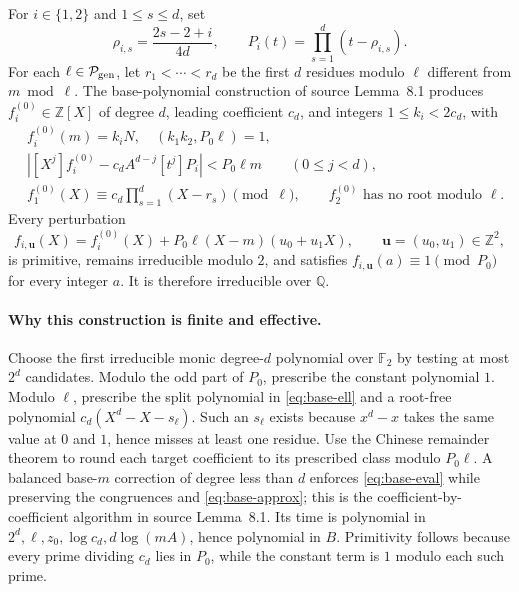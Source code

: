 For \(i\in\{1,2\}\) and \(1\le s\le d\), set
\[
 \rho_{i,s}=\frac{2s-2+i}{4d},\qquad
 P_i(t)=\prod_{s=1}^d(t-\rho_{i,s}).
\]
For each \(\ell\in\mathcal P_{\rm gen}\), let \(r_1<\cdots<r_d\)
be the first \(d\) residues modulo \(\ell\) different from \(m\bmod\ell\).
The base-polynomial construction of source Lemma~8.1 produces
\(f_i^{(0)}\in\mathbb Z[X]\) of degree \(d\), leading coefficient
\(c_d\), and integers \(1\le k_i<2c_d\), with
\begin{align}
 &f_i^{(0)}(m)=k_iN,\quad
       (k_1k_2,P_0\ell)=1,\label{eq:base-eval}\\
 &\left|[X^j]f_i^{(0)}-c_dA^{d-j}[t^j]P_i\right|
       <P_0\ell m\qquad(0\le j<d),\label{eq:base-approx}\\
 &f_1^{(0)}(X)\equiv c_d\prod_{s=1}^d(X-r_s)\pmod\ell,
       \qquad f_2^{(0)}\text{ has no root modulo }\ell.\label{eq:base-ell}
\end{align}
Every perturbation
\begin{equation}\label{eq:perturb}
 f_{i,\mathbf u}(X)
 =f_i^{(0)}(X)+P_0\ell(X-m)(u_0+u_1X),
 \qquad \mathbf u=(u_0,u_1)\in\mathbb Z^2,
\end{equation}
is primitive, remains irreducible modulo \(2\), and satisfies
\(f_{i,\mathbf u}(a)\equiv1\pmod{P_0}\) for every integer \(a\).
It is therefore irreducible over \(\mathbb Q\).

\paragraph{Why this construction is finite and effective.}
Choose the first irreducible monic degree-\(d\) polynomial over
\(\mathbb F_2\) by testing at most \(2^d\) candidates.  Modulo the odd
part of \(P_0\), prescribe the constant polynomial \(1\).  Modulo
\(\ell\), prescribe the split polynomial in \eqref{eq:base-ell} and a
root-free polynomial \(c_d(X^d-X-s_\ell)\).  Such an \(s_\ell\) exists
because \(x^d-x\) takes the same value at \(0\) and \(1\), hence misses
at least one residue.  Use the Chinese remainder theorem to round each
target coefficient to its prescribed class modulo \(P_0\ell\).
A balanced base-\(m\) correction of degree less than \(d\) enforces
\eqref{eq:base-eval} while preserving the congruences and
\eqref{eq:base-approx}; this is the coefficient-by-coefficient algorithm
in source Lemma~8.1.  Its time is polynomial in
\(2^d,\ell,z_0,\log c_d,d\log(mA)\), hence polynomial in \(B\).
Primitivity follows because every prime dividing \(c_d\) lies in
\(P_0\), while the constant term is \(1\) modulo each such prime.

